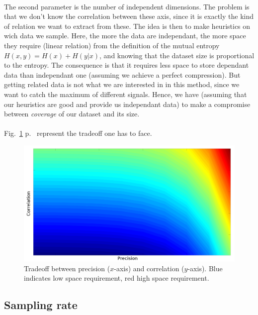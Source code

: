 \documentclass[twoside]{report}
\begin{document}
	\paragraph{}
	The second parameter is the number of independent dimensions. The problem is that we don't know the correlation between these axis, since it is exactly the kind of relation we want to extract from these. The idea is then to make heuristics on wich data we sample. Here, the more the data are independant, the more space they require (linear relation) from the definition of the mutual entropy $H(x,y) = H(x)+H(y|x)$, and knowing that the dataset size is proportional to the entropy. The consequence is that it requires less space to store dependant data than independant one (assuming we achieve a perfect compression). But getting related data is not what we are interested in in this method, since we want to catch the maximum of different signals. Hence, we have (assuming that our heuristics are good and provide us independant data) to make a compromise between \emph{coverage} of our dataset and its size.
	\paragraph{}
	Fig.~\ref{fig:tradeoff} p.~\pageref{fig:tradeoff} represent the tradeoff one has to face.
	\begin{figure}
		\begin{center}
			\includegraphics[width=\textwidth]{tradeoff_m2.png}
			\caption{Tradeoff between precision ($x$-axis) and correlation ($y$-axis). Blue indicates low space requirement, red high space requirement.}
			\label{fig:tradeoff}
		\end{center}
	\end{figure}
	\subsection{Sampling rate}
\end{document}
